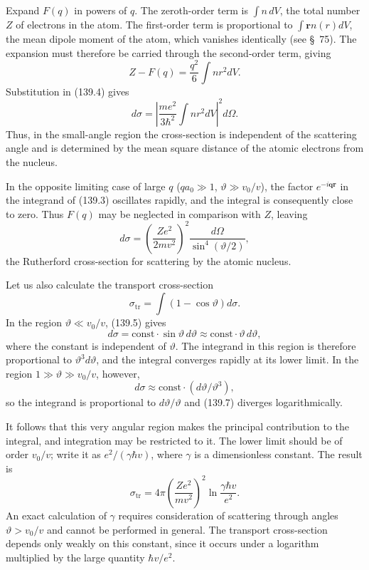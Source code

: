 Expand $F(q)$ in powers of $q$. The zeroth-order term is $\int n\,dV$, the
total number $Z$ of electrons in the atom. The first-order term is
proportional to $\int\mathbf r n(r)dV$, the mean dipole moment of the atom,
which vanishes identically (see \S~75). The expansion must therefore be
carried through the second-order term, giving
\[
 Z-F(q)=\frac{q^2}{6}\int nr^2dV.
\]
Substitution in (139.4) gives
\begin{equation}
 d\sigma=\left|\frac{me^2}{3\hbar^2}\int nr^2dV\right|^2d\Omega.
 \tag{139.5}
\end{equation}
Thus, in the small-angle region the cross-section is independent of the
scattering angle and is determined by the mean square distance of the atomic
electrons from the nucleus.

In the opposite limiting case of large $q$ ($qa_0\gg1$,
$\vartheta\gg v_0/v$), the factor $e^{-i\mathbf{qr}}$ in the integrand of
(139.3) oscillates rapidly, and the integral is consequently close to zero.
Thus $F(q)$ may be neglected in comparison with $Z$, leaving
\begin{equation}
 d\sigma=\left(\frac{Ze^2}{2mv^2}\right)^2
 \frac{d\Omega}{\sin^4(\vartheta/2)},
 \tag{139.6}
\end{equation}
the Rutherford cross-section for scattering by the atomic nucleus.

Let us also calculate the transport cross-section
\begin{equation}
 \sigma_{\mathrm{tr}}=\int(1-\cos\vartheta)d\sigma.
 \tag{139.7}
\end{equation}
In the region $\vartheta\ll v_0/v$, (139.5) gives
\[
 d\sigma=\mathrm{const}\cdot\sin\vartheta\,d\vartheta
 \approx\mathrm{const}\cdot\vartheta\,d\vartheta,
\]
where the constant is independent of $\vartheta$. The integrand in this region
is therefore proportional to $\vartheta^3d\vartheta$, and the integral
converges rapidly at its lower limit. In the region
$1\gg\vartheta\gg v_0/v$, however,
\[
 d\sigma\approx\mathrm{const}\cdot(d\vartheta/\vartheta^3),
\]
so the integrand is proportional to $d\vartheta/\vartheta$ and (139.7)
diverges logarithmically.

It follows that this very angular region makes the principal contribution to
the integral, and integration may be restricted to it. The lower limit should
be of order $v_0/v$; write it as $e^2/(\gamma\hbar v)$, where $\gamma$ is a
dimensionless constant. The result is
\begin{equation}
 \sigma_{\mathrm{tr}}=4\pi\left(\frac{Ze^2}{mv^2}\right)^2
 \ln\frac{\gamma\hbar v}{e^2}.
 \tag{139.8}
\end{equation}
An exact calculation of $\gamma$ requires consideration of scattering through
angles $\vartheta>v_0/v$ and cannot be performed in general. The transport
cross-section depends only weakly on this constant, since it occurs under a
logarithm multiplied by the large quantity $\hbar v/e^2$.


